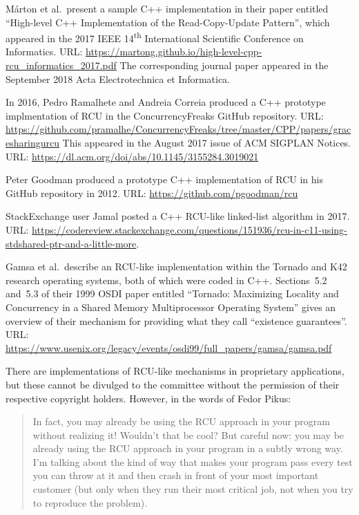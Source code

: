 M\'arton et al.~present a sample C++ implementation in their paper
entitled ``High-level C++ Implementation of the Read-Copy-Update
Pattern'', which appeared in the 2017 IEEE 14\textsuperscript{th}
International Scientific Conference on Informatics.
URL: \url{https://martong.github.io/high-level-cpp-rcu_informatics_2017.pdf}
The corresponding journal paper appeared in the September 2018 Acta
Electrotechnica et Informatica.

In 2016, Pedro Ramalhete and Andreia Correia produced a C++ prototype
implmentation of RCU in the ConcurrencyFreaks GitHub repository.
URL: \url{https://github.com/pramalhe/ConcurrencyFreaks/tree/master/CPP/papers/gracesharingurcu}
This appeared in the August 2017 issue of ACM SIGPLAN Notices.
URL: \url{https://dl.acm.org/doi/abs/10.1145/3155284.3019021}

Peter Goodman produced a prototype C++ implementation of RCU in his
GitHub repository in 2012.
URL: \url{https://github.com/pgoodman/rcu}

StackExchange user Jamal posted a C++ RCU-like linked-list algorithm
in 2017.
URL: \url{https://codereview.stackexchange.com/questions/151936/rcu-in-c11-using-stdshared-ptr-and-a-little-more}.

Gamsa et al.~describe an RCU-like implementation within the Tornado
and K42 research operating systems, both of which were coded in C++.
Sections~5.2 and~5.3 of their 1999 OSDI paper entitled ``Tornado: Maximizing
Locality and Concurrency in a Shared Memory Multiprocessor Operating
System'' gives an overview of their mechanism for providing what they call
``existence guarantees''.
URL: \url{https://www.usenix.org/legacy/events/osdi99/full_papers/gamsa/gamsa.pdf}

There are implementations of RCU-like mechanisms in proprietary
applications, but these cannot be divulged to the committee without the
permission of their respective copyright holders.
However, in the words of Fedor Pikus:

\begin{quote}
	In fact, you may already be using the RCU approach in your program
	without realizing it! Wouldn't that be cool? But careful now:
	you may be already using the RCU approach in your program in a
	subtly wrong way. I'm talking about the kind of way that makes
	your program pass every test you can throw at it and then crash
	in front of your most important customer (but only when they
	run their most critical job, not when you try to reproduce
	the problem).
\end{quote}

